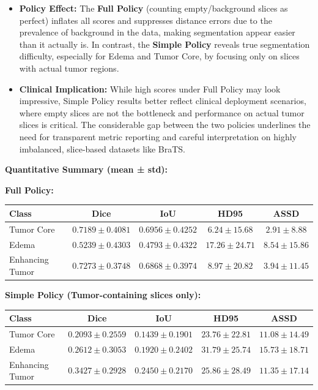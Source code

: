 \begin{itemize}
    \item \textbf{Policy Effect:} 
    The \textbf{Full Policy} (counting empty/background slices as perfect) inflates all scores and suppresses distance errors due to the prevalence of background in the data, making segmentation appear easier than it actually is. In contrast, the \textbf{Simple Policy} reveals true segmentation difficulty, especially for Edema and Tumor Core, by focusing only on slices with actual tumor regions.
    
    \item \textbf{Clinical Implication:}
    While high scores under Full Policy may look impressive, Simple Policy results better reflect clinical deployment scenarios, where empty slices are not the bottleneck and performance on actual tumor slices is critical. The considerable gap between the two policies underlines the need for transparent metric reporting and careful interpretation on highly imbalanced, slice-based datasets like BraTS.
\end{itemize}

\clearpage

\textbf{Quantitative Summary (mean ± std):}

\vspace{1em}
\noindent\textbf{Full Policy:}

\begin{center}
\begin{tabular}{lcccc}
\toprule
\textbf{Class} & \textbf{Dice} & \textbf{IoU} & \textbf{HD95} & \textbf{ASSD} \\
\midrule
Tumor Core       & $0.7189 \pm 0.4081$ & $0.6956 \pm 0.4252$ & $6.24 \pm 15.68$ & $2.91 \pm 8.88$ \\
Edema            & $0.5239 \pm 0.4303$ & $0.4793 \pm 0.4322$ & $17.26 \pm 24.71$ & $8.54 \pm 15.86$ \\
Enhancing Tumor  & $0.7273 \pm 0.3748$ & $0.6868 \pm 0.3974$ & $8.97 \pm 20.82$ & $3.94 \pm 11.45$ \\
\bottomrule
\end{tabular}
\end{center}

\vspace{1em}
\noindent\textbf{Simple Policy (Tumor-containing slices only):}

\begin{center}
\begin{tabular}{lcccc}
\toprule
\textbf{Class} & \textbf{Dice} & \textbf{IoU} & \textbf{HD95} & \textbf{ASSD} \\
\midrule
Tumor Core       & $0.2093 \pm 0.2559$ & $0.1439 \pm 0.1901$ & $23.76 \pm 22.81$ & $11.08 \pm 14.49$ \\
Edema            & $0.2612 \pm 0.3053$ & $0.1920 \pm 0.2402$ & $31.79 \pm 25.74$ & $15.73 \pm 18.71$ \\
Enhancing Tumor  & $0.3427 \pm 0.2928$ & $0.2450 \pm 0.2170$ & $25.86 \pm 28.49$ & $11.35 \pm 17.14$ \\
\bottomrule
\end{tabular}
\end{center}

